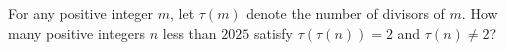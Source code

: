 For any positive integer $m$, let $\tau(m)$ denote the number of divisors of $m$. How many positive integers $n$ less than $2025$ satisfy $\tau(\tau(n))=2$ and $\tau(n)\neq 2$?
